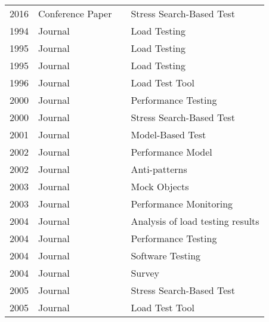 \begin{table}[]
\begin{tabular}{llll}
2016          & Conference Paper & \cite{Gois2016}                 & Stress Search-Based Test         \\
1994          & Journal          & \cite{Avritzer1994}             & Load Testing                     \\
1995          & Journal          & \cite{Avritzer1995b}            & Load Testing                     \\
1995          & Journal          & \cite{Trent1995}                & Load Testing                     \\
1996          & Journal          & \cite{Yang1996}                 & Load Test Tool                   \\
2000          & Journal          & \cite{Weyuker2000}              & Performance Testing              \\
2000          & Journal          & \cite{Gross2000}                & Stress Search-Based Test         \\
2001          & Journal          & \cite{El-far2001}               & Model-Based Test                 \\
2002          & Journal          & \cite{Menasce2002a}             & Performance Model                \\
2002          & Journal          & \cite{Smith2002}                & Anti-patterns                    \\
2003          & Journal          & \cite{Brown2003}                & Mock Objects                     \\
2003          & Journal          & \cite{Aguilera2003}             & Performance Monitoring           \\
2004          & Journal          & \cite{Dumitrescu2004}           & Analysis of load testing results \\
2004          & Journal          & \cite{Barber2004}               & Performance Testing              \\
2004          & Journal          & \cite{Sandler2004}              & Software Testing                 \\
2004          & Journal          & \cite{McMinn2004}               & Survey                           \\
2005          & Journal          & \cite{Briand2005}               & Stress Search-Based Test         \\
2005          & Journal          & \cite{Kiran2015}                & Load Test Tool                   \\

\end{tabular}
\end{table}
